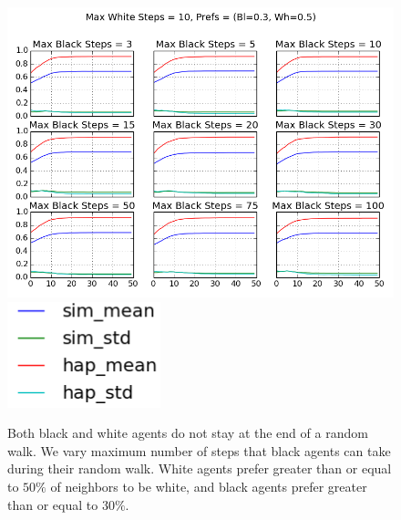 \documentclass[11pt,twoside]{amsart}
\theoremstyle{theorem}
\theoremstyle{definition}
\theoremstyle{remark}
\begin{document}
    \begin{figure}[p]
        \center
        \includegraphics[scale=0.60]{no_stay_at_end_of_rw_change_black_max.png}
        \includegraphics[scale=0.40]{no_stay_at_end_legend.png}
        \caption{Both black and white agents do not stay at the end of a random walk. We vary maximum number of steps that black agents can take during their random walk. White agents prefer greater than or equal to $50\%$ of neighbors to be white, and black agents prefer greater than or equal to $30\%$. }
        \label{fig:no_stay_black}
    \end{figure}
\end{document}
